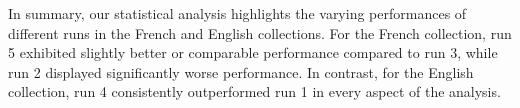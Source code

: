 In summary, our statistical analysis highlights the varying performances of different runs in the French and English collections. 
For the French collection, run 5 exhibited slightly better or comparable performance compared to run 3, while run 2 displayed significantly worse performance. 
In contrast, for the English collection, run 4 consistently outperformed run 1 in every aspect of the analysis.

































